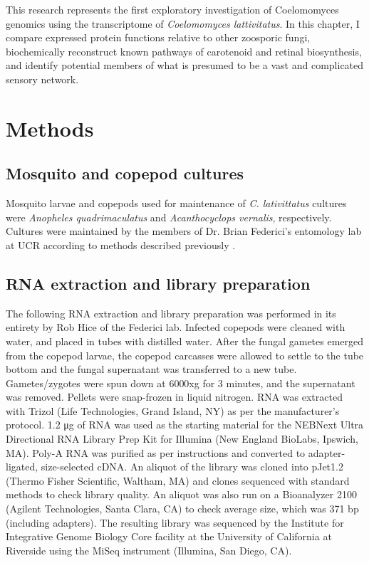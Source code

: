 \indent This research represents the first exploratory investigation of Coelomomyces genomics using the transcriptome of \textit{Coelomomyces lattivitatus}. In this chapter, I compare expressed protein functions relative to other zoosporic fungi, biochemically reconstruct known pathways of carotenoid and retinal biosynthesis, and identify potential members of what is presumed to be a vast and complicated sensory network. \\
\section{Methods}
\subsection*{Mosquito and copepod cultures}
Mosquito larvae and copepods used for maintenance of \textit{C. lativittatus} cultures were \textit{Anopheles quadrimaculatus} and \textit{Acanthocyclops vernalis}, respectively. Cultures were maintained by the members of Dr. Brian Federici's entomology lab at UCR according to methods described previously \cite{Federici1983}.\\ 
\subsection*{RNA extraction and library preparation}
The following RNA extraction and library preparation was performed in its entirety by Rob Hice of the Federici lab. Infected copepods were cleaned with water, and placed in tubes with distilled water. After the fungal gametes emerged from the copepod larvae, the copepod carcasses were allowed to settle to the tube bottom and the fungal supernatant was transferred to a new tube. Gametes/zygotes were spun down at 6000xg for 3 minutes, and the supernatant was removed. Pellets were snap-frozen in liquid nitrogen. RNA was extracted with Trizol  (Life Technologies, Grand Island, NY) as per the manufacturer’s protocol. 1.2 μg of RNA was used as the starting material for the NEBNext Ultra Directional RNA Library Prep Kit for Illumina (New England BioLabs, Ipswich, MA). Poly-A RNA was purified as per instructions and converted to adapter-ligated, size-selected cDNA. An aliquot of the library was cloned into pJet1.2 (Thermo Fisher Scientific, Waltham, MA) and clones sequenced with standard methods to check library quality. An aliquot was also run on a Bioanalyzer 2100 (Agilent Technologies, Santa Clara, CA) to check average size, which was 371 bp (including adapters). The resulting library was sequenced by the Institute for Integrative Genome Biology Core facility at the University of California at Riverside using the MiSeq instrument (Illumina, San Diego, CA).\\
